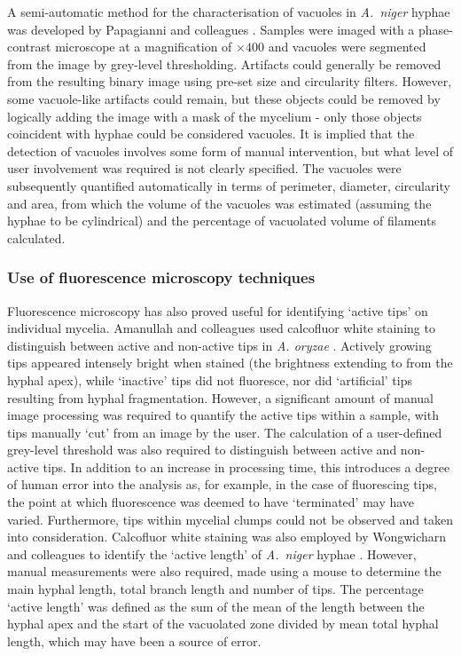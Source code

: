 A semi-automatic method for the characterisation of vacuoles in \emph{A.~niger} hyphae was developed by Papagianni and colleagues \cite{papagianni1999}. Samples were imaged with a phase-contrast microscope at a magnification of $\times 400$ and vacuoles were segmented from the image by grey-level thresholding. Artifacts could generally be removed from the resulting binary image using pre-set size and circularity filters. However, some vacuole-like artifacts could remain, but these objects could be removed by logically adding the image with a mask of the mycelium - only those objects coincident with hyphae could be considered vacuoles. It is implied that the detection of vacuoles involves some form of manual intervention, but what level of user involvement was required is not clearly specified. The vacuoles were subsequently quantified automatically in terms of perimeter, diameter, circularity and area, from which the volume of the vacuoles was estimated (assuming the hyphae to be cylindrical) and the percentage of vacuolated volume of filaments calculated.

\subsubsection{Use of fluorescence microscopy techniques}

Fluorescence microscopy has also proved useful for identifying \lq active tips' on individual mycelia. Amanullah and colleagues used calcofluor white staining \cite{gull1974} to distinguish between active and non-active tips in \emph{A. oryzae} \cite{amanullah2002}. Actively growing tips appeared intensely bright when stained (the brightness extending to  from the hyphal apex), while \lq inactive' tips did not fluoresce, nor did \lq artificial' tips resulting from hyphal fragmentation. However, a significant amount of manual image processing was required to quantify the active tips within a sample, with tips manually \lq cut' from an image by the user. The calculation of a user-defined grey-level threshold was also required to distinguish between active and non-active tips. In addition to an increase in processing time, this introduces a degree of human error into the analysis as, for example, in the case of fluorescing tips, the point at which fluorescence was deemed to have \lq terminated' may have varied. Furthermore, tips within mycelial clumps could not be observed and taken into consideration. Calcofluor white staining was also employed by Wongwicharn and colleagues to identify the \lq active length' of \emph{A.~niger} hyphae  \cite{wongwicharn1999}. However, manual measurements were also required, made using a mouse to determine the main hyphal length, total branch length and number of tips. The percentage \lq active length' was defined as the sum of the mean of the length between the hyphal apex and the start of the vacuolated zone divided by mean total hyphal length, which may have been a source of error.

